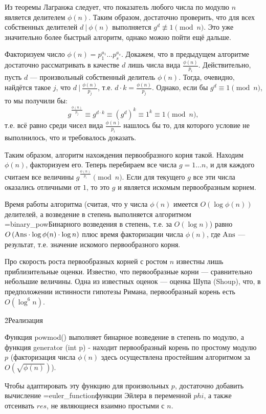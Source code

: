 Из теоремы Лагранжа следует, что показатель любого числа по модулю $n$ является делителем $\phi(n)$. Таким образом, достаточно проверить, что для всех собственных делителей $d\ |\ \phi(n)$ выполняется $g^d \not\equiv 1 \pmod{n}$. Это уже значительно более быстрый алгоритм, однако можно пойти ещё дальше.

Факторизуем число $\phi(n) = p_1^{a_1} \ldots p_s^{a_s}$. Докажем, что в предыдущем алгоритме достаточно рассматривать в качестве $d$ лишь числа вида $\frac{ \phi(n) }{ p_i }$. Действительно, пусть $d$ --- произвольный собственный делитель $\phi(n)$. Тогда, очевидно, найдётся такое $j$, что $d\ |\ \frac{ \phi(n) }{ p_j }$, т.е. $d \cdot k = \frac{ \phi(n) }{ p_j }$. Однако, если бы $g^d \equiv 1 \pmod{n}$, то мы получили бы:
$$ g^{\frac{ \phi(n) }{ p_j }} \equiv g^{d \cdot k} \equiv {\left( g^d \right) }^k \equiv 1^k \equiv 1 \pmod{n}, $$
т.е. всё равно среди чисел вида $\frac{ \phi(n) }{ p_i }$ нашлось бы то, для которого условие не выполнилось, что и требовалось доказать.

Таким образом, алгоритм нахождения первообразного корня такой. Находим $\phi(n)$, факторизуем его. Теперь перебираем все числа $g = 1 \ldots n$, и для каждого считаем все величины $g^{ \frac{ \phi(n) }{ p_i } } \pmod{n}$. Если для текущего $g$ все эти числа оказались отличными от $1$, то это $g$ и является искомым первообразным корнем.

Время работы алгоритма (считая, что у числа $\phi(n)$ имеется $O \left( \log \phi(n) \right)$ делителей, а возведение в степень выполняется алгоритмом \algohref=binary_pow{Бинарного возведения в степень}, т.е. за $O(\log n)$) равно $O \left( {\rm Ans} \cdot \log \phi(n) \cdot \log n \right)$ плюс время факторизации числа $\phi(n)$, где $\rm Ans$ --- результат, т.е. значение искомого первообразного корня.

Про скорость роста первообразных корней с ростом $n$ известны лишь приблизительные оценки. Известно, что первообразные корни --- сравнительно небольшие величины. Одна из известных оценок --- оценка Шупа (Shoup), что, в предположении истинности гипотезы Римана, первообразный корень есть $O (\log^6 n)$.

\h2{Реализация}

Функция powmod() выполняет бинарное возведение в степень по модулю, а функция generator (int p) - находит первообразный корень по простому модулю $p$ (факторизация числа $\phi(n)$ здесь осуществлена простейшим алгоритмом за $O( \sqrt{ \phi(n) } )$).

Чтобы адаптировать эту функцию для произвольных $p$, достаточно добавить вычисление \algohref=euler_function{функции Эйлера} в переменной $phi$, а также отсеивать $res$, не являющиеся взаимно простыми с $n$.

